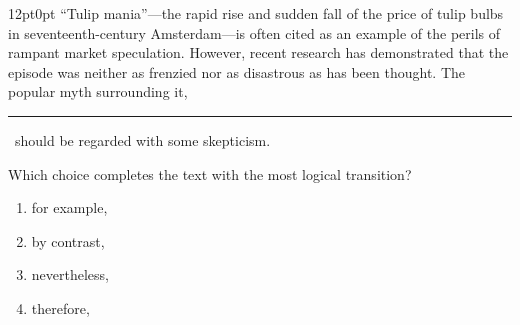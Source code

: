 \documentclass[11pt, twocolumn]{article}
\newcounter{questionnum}
\begin{document}
\vspace{6pt}\noindent
\begin{minipage}{\columnwidth}\raggedright
\noindent{}\par\vspace{8pt}
\begin{adjustwidth}{12pt}{0pt}
``Tulip mania''---the rapid rise and sudden fall of the price of tulip bulbs in seventeenth-century Amsterdam---is often cited as an example of the perils of rampant market speculation. However, recent research has demonstrated that the episode was neither as frenzied nor as disastrous as has been thought. The popular myth surrounding it, \,\rule{2cm}{0.4pt}\, should be regarded with some skepticism.
\vspace{6pt}

Which choice completes the text with the most logical transition?
\begin{enumerate}[label=\Alph*),leftmargin=18pt,topsep=3pt,itemsep=2pt]
  \item for example,
  \item by contrast,
  \item nevertheless,
  \item therefore,
\end{enumerate}
\end{adjustwidth}
\end{minipage}\par
\end{document}
